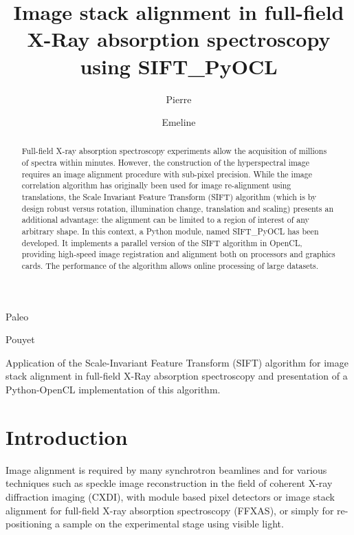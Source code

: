 \documentclass[preprint]{iucr}
\begin{document}
\title{Image stack alignment in full-field X-Ray absorption spectroscopy using
SIFT\_PyOCL}

    \author[a]{Pierre}{Paleo}
    \author[a]{Emeline}{Pouyet}

\maketitle

\begin{synopsis}
Application of the Scale-Invariant Feature Transform (SIFT) algorithm for image
stack alignment in full-field X-Ray absorption spectroscopy and presentation of
a Python-OpenCL implementation of this algorithm.
\end{synopsis}

\begin{abstract}
Full-field X-ray absorption spectroscopy experiments allow the acquisition
of millions of spectra within minutes.
However, the construction of the hyperspectral image requires an image alignment
procedure with sub-pixel precision.
While the image correlation algorithm has originally been used for image
re-alignment using translations, the Scale Invariant Feature Transform (SIFT)
algorithm (which is by design robust versus rotation, illumination change,
translation and scaling) presents an additional advantage: the alignment can be
limited to a region of interest of any arbitrary shape.
In this context, a Python module, named  SIFT\_PyOCL has been developed.
It implements a parallel version of the SIFT algorithm in OpenCL, providing
high-speed image registration and alignment both on processors and graphics cards.
The performance of the algorithm allows online processing of large datasets.

\end{abstract}

\section{Introduction}

Image alignment is required by many synchrotron beamlines and for
various techniques such as speckle image reconstruction in the field of
coherent X-ray diffraction imaging (CXDI), with module based pixel detectors or
image stack alignment for full-field X-ray absorption spectroscopy (FFXAS), or
simply for re-positioning a sample on the experimental stage using visible
light.
\end{document}
